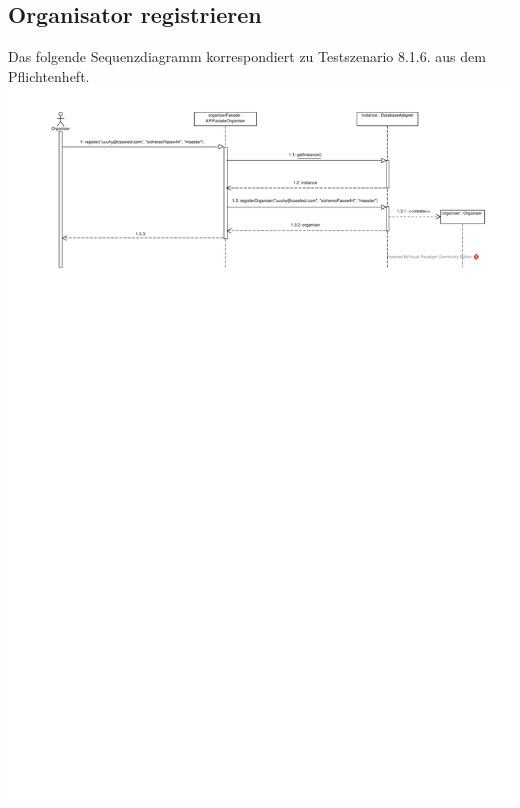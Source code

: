 \documentclass[a4paper]{scrreprt}
\begin{document}
	\subsection{Organisator registrieren}
	Das folgende Sequenzdiagramm korrespondiert zu Testszenario 8.1.6. aus dem Pflichtenheft. \\
	\includegraphics[width=\textwidth]{img/Organisator_registrieren.pdf}
\end{document}
